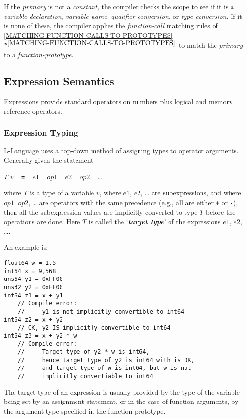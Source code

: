 \documentclass[12pt]{article}
\newcommand{\TT}[1]{{\tt \bfseries #1}}
\newcommand{\key}[1]{{\bf \em #1}\index{#1}}
\newcommand{\itemref}[1]{\ref{#1}$^{p\pageref{#1}}$}
\newenvironment{indpar}[1][0.3in]%
	{\begin{list}{}%
		     {\setlength{\itemsep}{0in}%
		      \setlength{\topsep}{0in}%
		      \setlength{\parsep}{1ex}%
		      \setlength{\labelwidth}{#1}%
		      \setlength{\leftmargin}{#1}%
		      \addtolength{\leftmargin}{\labelsep}}%
	 \item}%
	{\end{list}}
\begin{document}
If the {\em primary} is not a {\em constant}, the compiler
checks the scope to see if it is a {\em variable-declaration},
{\em variable-name}, {\em qualifier-conversion}, or
{\em type-conversion}.  If it is none of these, the
compiler applies the {\em function-call} matching rules of
\itemref{MATCHING-FUNCTION-CALLS-TO-PROTOTYPES}
to match the {\em primary} to a {\em function-prototype}.

\subsection{Expression Semantics}

Expressions provide standard operators on numbers plus logical and
memory reference operators.

\subsubsection{Expression Typing}
\label{EXPRESSION-TYPING}

L-Language uses a top-down method of assigning types to operator arguments.
Generally given the statement
\begin{center}
$T$ $v$ ~ \TT{=} ~ $e1$ ~ $op1$ ~ $e2$ ~ $op2$ ~ \ldots{}
\end{center}
where $T$ is a type of a variable $v$, where $e1$, $e2$, \ldots{} are
subexpressions, and where $op1$, $op2$, \ldots{} are operators with the
same precedence (e.g., all are either \TT{+} or \TT{-}), then
all the subexpression values are implicitly converted to type $T$
before the operations are done.  Here $T$ is called the `\key{target type}'
of the expressions $e1$, $e2$, \ldots{}.

An example is:

\begin{indpar}\begin{verbatim}
float64 w = 1.5
int64 x = 9,568
uns64 y1 = 0xFF00
uns32 y2 = 0xFF00
int64 z1 = x + y1
    // Compile error:
    //     y1 is not implicitly convertible to int64
int64 z2 = x + y2
    // OK, y2 IS implicitly convertible to int64
int64 z3 = x + y2 * w
    // Compile error:
    //     Target type of y2 * w is int64,
    //     hence target type of y2 is int64 with is OK,
    //     and target type of w is int64, but w is not
    //     implicitly convertiable to int64
\end{verbatim}\end{indpar}

The target type of an expression is usually provided by the
type of the variable being set by an assignment statement, or in the
case of function arguments, by the argument type specified in the
function prototype.
\end{document}
